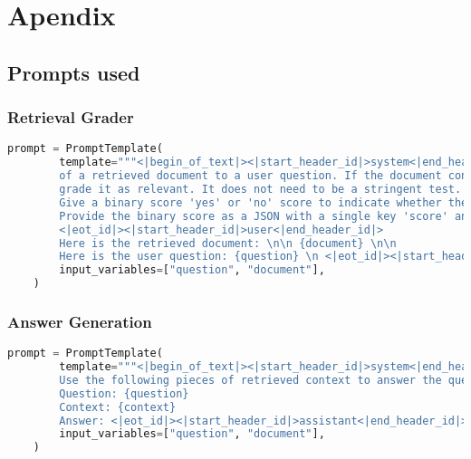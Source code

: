 \chapter{Apendix}

\section{Prompts used}

\subsection{Retrieval Grader}

\begin{lstlisting}[language=Python, caption=\it{Prompt used for the retrieval grader.}]
    prompt = PromptTemplate(
        template="""<|begin_of_text|><|start_header_id|>system<|end_header_id|> You are a grader assessing relevance 
        of a retrieved document to a user question. If the document contains keywords related to the user question, 
        grade it as relevant. It does not need to be a stringent test. The goal is to filter out erroneous retrievals. \n
        Give a binary score 'yes' or 'no' score to indicate whether the document is relevant to the question. \n
        Provide the binary score as a JSON with a single key 'score' and no premable or explanation.
        <|eot_id|><|start_header_id|>user<|end_header_id|>
        Here is the retrieved document: \n\n {document} \n\n
        Here is the user question: {question} \n <|eot_id|><|start_header_id|>assistant<|end_header_id|>""",
        input_variables=["question", "document"],
    )
\end{lstlisting}

\subsection{Answer Generation}


\begin{lstlisting}[language=Python, caption=\it{Prompt used for answer generation.}]
    prompt = PromptTemplate(
        template="""<|begin_of_text|><|start_header_id|>system<|end_header_id|> You are an assistant for question-answering tasks. 
        Use the following pieces of retrieved context to answer the question. If you don't know the answer, just say that you don't know. <|eot_id|><|start_header_id|>user<|end_header_id|>
        Question: {question} 
        Context: {context} 
        Answer: <|eot_id|><|start_header_id|>assistant<|end_header_id|>""",
        input_variables=["question", "document"],
    )
\end{lstlisting}

